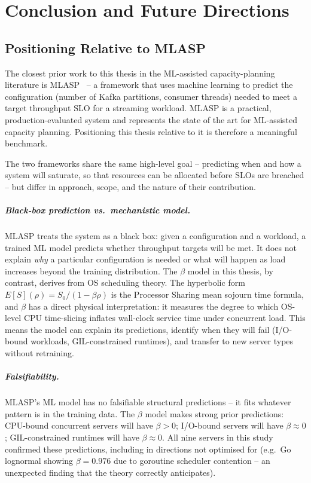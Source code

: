 ﻿\chapter{Conclusion and Future Directions}
\label{ch:conclusion_b}

\section{Positioning Relative to MLASP}
\label{sec:mlasp-comparison}

The closest prior work to this thesis in the ML-assisted capacity-planning literature is MLASP~\cite{VituiChen2021} -- a framework that uses machine learning to predict the configuration (number of Kafka partitions, consumer threads) needed to meet a target throughput SLO for a streaming workload. MLASP is a practical, production-evaluated system and represents the state of the art for ML-assisted capacity planning. Positioning this thesis relative to it is therefore a meaningful benchmark.

The two frameworks share the same high-level goal -- predicting when and how a system will saturate, so that resources can be allocated before SLOs are breached -- but differ in approach, scope, and the nature of their contribution.

\paragraph{Black-box prediction vs.\ mechanistic model.}
MLASP treats the system as a black box: given a configuration and a workload, a trained ML model predicts whether throughput targets will be met. It does not explain \emph{why} a particular configuration is needed or what will happen as load increases beyond the training distribution. The $\beta$ model in this thesis, by contrast, derives from OS scheduling theory. The hyperbolic form $E[S](\rho) = S_0 / (1 - \beta\rho)$ is the Processor Sharing mean sojourn time formula, and $\beta$ has a direct physical interpretation: it measures the degree to which OS-level CPU time-slicing inflates wall-clock service time under concurrent load. This means the model can explain its predictions, identify when they will fail (I/O-bound workloads, GIL-constrained runtimes), and transfer to new server types without retraining.

\paragraph{Falsifiability.}
MLASP's ML model has no falsifiable structural predictions -- it fits whatever pattern is in the training data. The $\beta$ model makes strong prior predictions: CPU-bound concurrent servers will have $\beta > 0$; I/O-bound servers will have $\beta \approx 0$; GIL-constrained runtimes will have $\beta \approx 0$. All nine servers in this study confirmed these predictions, including in directions not optimised for (e.g.\ Go lognormal showing $\beta = 0.976$ due to goroutine scheduler contention -- an unexpected finding that the theory correctly anticipates).

